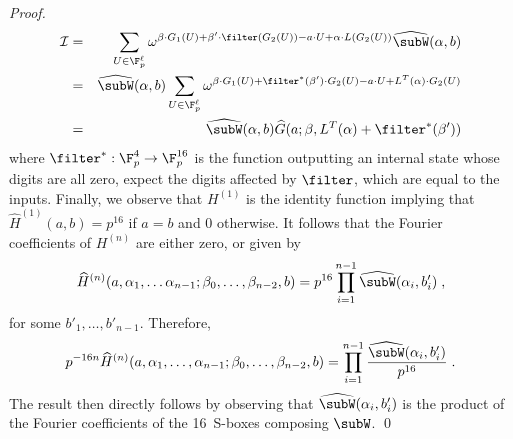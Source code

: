 \begin{proof}
\begin{eqnarray*}
   \mathcal{I} & = & \sum_{U \in \F_p^\ell} \omega^{\beta \cdot G_1(U) + \beta' \cdot \filter(G_2(U))- a \cdot U + \alpha \cdot L(G_2(U))} {\widehat \subW}(\alpha, b)\\
   & = & {\widehat \subW}(\alpha, b)\sum_{U \in \F_p^\ell} \omega^{\beta \cdot G_1(U) + \filter^*(\beta') \cdot G_2(U)- a \cdot U + L^T(\alpha) \cdot G_2(U)} \\
   & = & {\widehat \subW}(\alpha, b) {\widehat G}(a ; \beta, L^T(\alpha) + \filter^*(\beta'))
   \end{eqnarray*}
 where \(\filter^*: \F_p^4 \rightarrow \F_p^{16}\) is the function outputting an internal state whose digits are all zero, expect the digits affected by \(\filter\), which are equal to the inputs.
       Finally, we observe that \(H^{(1)}\) is the identity function implying that \({\widehat H^{(1)}}(a,b) = p^{16}\) if \(a=b\) and \(0\) otherwise.
       It follows that the Fourier coefficients of \(H^{(n)}\) are either zero, or given by %
       \[{\widehat H^{(n)}}(a, \alpha_1, \ldots \alpha_{n-1}; \beta_0, \ldots, \beta_{n-2}, b) = p^{16} \prod_{i=1}^{n-1} {\widehat \subW}(\alpha_{i}, b'_i) \;,\]
       for some \(b'_1, \ldots, b'_{n-1}\).
       Therefore,
       \[p^{-16n} {\widehat H^{(n)}}(a, \alpha_1, \ldots, \alpha_{n-1}; \beta_0, \ldots, \beta_{n-2}, b) = \prod_{i=1}^{n-1} \frac{{\widehat \subW}(\alpha_{i}, b'_i)}{p^{16}} \;.\]
   The result then directly follows by observing that \({\widehat \subW}(\alpha_{i}, b'_i)\) is the product of the Fourier coefficients of the 16~S-boxes composing \(\subW\).
\hfil\qed
  \end{proof}


   
     
